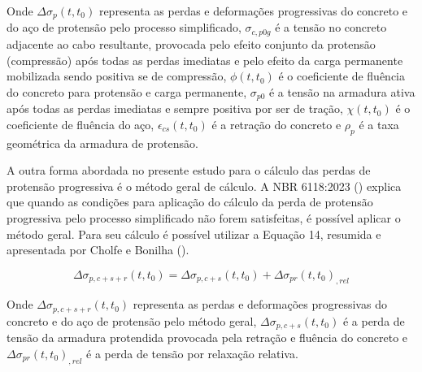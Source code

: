 Onde $\Delta\sigma_{p}(t,t_0)$ representa as perdas e deformações progressivas do concreto e do aço de protensão pelo processo simplificado, $\sigma_{c,p0g}$ é a tensão no concreto adjacente ao cabo resultante, provocada pelo efeito conjunto da protensão (compressão) após todas as perdas imediatas e pelo efeito da carga permanente mobilizada sendo positiva se de compressão, $\phi(t,t_0)$ é o coeficiente de fluência do concreto para protensão e carga permanente, $\sigma_{p0}$ é a tensão na armadura ativa após todas as perdas imediatas e sempre positiva por ser de tração, $\chi(t,t_0)$ é o coeficiente de fluência do aço, $\epsilon_{cs}(t,t_0)$ é a retração do concreto e $\rho_{p}$ é a taxa geométrica da armadura de protensão.

A outra forma abordada no presente estudo para o cálculo das perdas de protensão progressiva é o método geral de cálculo. A NBR 6118:2023 (\citeyear{NOAB}) explica que quando as condições para aplicação do cálculo da perda de protensão progressiva pelo processo simplificado não forem satisfeitas, é possível aplicar o método geral. Para seu cálculo é possível utilizar a Equação 14, resumida e apresentada por Cholfe e Bonilha (\citeyear{CB}).

\begin{equation}
\Delta\sigma_{p,c+s+r}(t,t_0) = \Delta\sigma_{p,c+s}(t,t_0) + \Delta\sigma_{pr}(t,t_0)_{,rel}
\end{equation}\bigskip

Onde $\Delta\sigma_{p,c+s+r}(t,t_0)$ representa as perdas e deformações progressivas do concreto e do aço de protensão pelo método geral, $\Delta\sigma_{p,c+s}(t,t_0)$ é a perda de tensão da armadura protendida provocada pela retração e fluência do concreto e $\Delta\sigma_{pr}(t,t_0)_{,rel}$ é a perda de tensão por relaxação relativa.

\newpage